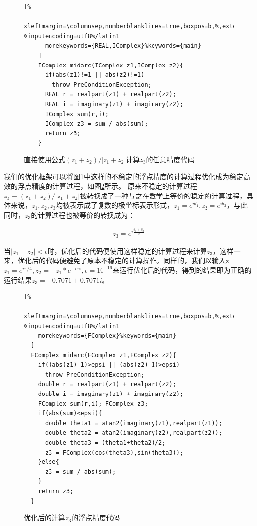 \begin{figure}[thbp]
    \begin{lstlisting}[%
      xleftmargin=\columnsep,numberblanklines=true,boxpos=b,%,extendedchars=\true, %inputencoding=utf8%/latin1
      morekeywords={REAL,IComplex}%keywords={main}
    ]
    IComplex midarc(IComplex z1,IComplex z2){
      if(abs(z1)!=1 || abs(z2)!=1)
        throw PreConditionException;
      REAL r = realpart(z1) + realpart(z2);   
      REAL i = imaginary(z1) + imaginary(z2); 
      IComplex sum(r,i);
      IComplex z3 = sum / abs(sum);           
      return z3;
    }
    \end{lstlisting}
    \caption{直接使用公式$(z_1+z_2)/|z_1+z_2|$计算$z_3$的任意精度代码}
    \label{lst:exoricode}
\end{figure}
    
我们的优化框架可以将图\ref{lst:exoricode}中这样的不稳定的浮点精度的计算过程优化成为稳定高效的浮点精度的计算过程，如图\ref{lst:exoptcode}所示。 原来不稳定的计算过程$z_3=(z_1+z_2)/|z_1+z_2|$被转换成了一种与之在数学上等价的稳定的计算过程，具体来说，$z_1,z_2,z_3$均被表示成了复数的极坐标表示形式，$z_1=e^{i\theta_1},z_2=e^{i\theta_2}$，与此同时，$z_3$的计算过程也被等价的转换成为：

\begin{align}\label{eq:optex}
    z_3=e^{i\frac{\theta_1+\theta_2}{2}}
\end{align}

当$|z_1+z_2|<\epsilon$时，优化后的代码便使用这样稳定的计算过程来计算$z_3$，这样一来，优化后的代码便避免了原本不稳定的计算操作。同样的，我们以输入z$z_1=e^{i\pi/4},z_2=-z_1*e^{-i \epsilon \pi},\epsilon=10^{-16}$来运行优化后的代码，得到的结果即为正确的运行结果$z_3=-0.7071+0.7071i$。

\begin{figure}[thbp]
  \begin{lstlisting}[%
    xleftmargin=\columnsep,numberblanklines=true,boxpos=b,%,extendedchars=\true, %inputencoding=utf8%/latin1
    morekeywords={FComplex}%keywords={main}
  ]
  FComplex midarc(FComplex z1,FComplex z2){
    if((abs(z1)-1)>epsi || (abs(z2)-1)>epsi)
      throw PreConditionException;
    double r = realpart(z1) + realpart(z2);      
    double i = imaginary(z1) + imaginary(z2);    
    FComplex sum(r,i); FComplex z3;              
    if(abs(sum)<epsi){
      double theta1 = atan2(imaginary(z1),realpart(z1));
      double theta2 = atan2(imaginary(z2),realpart(z2));
      double theta3 = (theta1+theta2)/2;
      z3 = FComplex(cos(theta3),sin(theta3));
    }else{
      z3 = sum / abs(sum);                       
    }
    return z3;
  }
  \end{lstlisting}
  \caption{优化后的计算$z_3$的浮点精度代码}
  \label{lst:exoptcode}
\end{figure}

